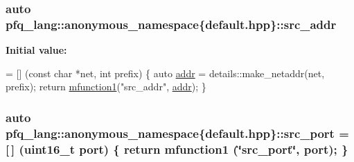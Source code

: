 \hypertarget{namespacepfq__lang_1_1anonymous__namespace_02default_8hpp_03_a63c87ff605d7cefa807fd61bc463785d}{
\subsubsection[{src\+\_\+addr}]{\setlength{\rightskip}{0pt plus 5cm}auto pfq\+\_\+lang\+::anonymous\+\_\+namespace\{default.\+hpp\}\+::src\+\_\+addr}}\label{namespacepfq__lang_1_1anonymous__namespace_02default_8hpp_03_a63c87ff605d7cefa807fd61bc463785d}
{\bfseries Initial value\+:}
\begin{DoxyCode}
= [] (\textcolor{keyword}{const} \textcolor{keywordtype}{char} *net, \textcolor{keywordtype}{int} prefix)
        \{
            \textcolor{keyword}{auto} \hyperlink{namespacepfq__lang_1_1anonymous__namespace_02default_8hpp_03_aafce8334d1be83bff9a2115439c8c453}{addr} = details::make\_netaddr(net, prefix);
            \textcolor{keywordflow}{return} \hyperlink{namespacepfq__lang_a3cc9d61411c0398bb46aa2b33a21f7ed}{mfunction1}(\textcolor{stringliteral}{"src\_addr"}, \hyperlink{namespacepfq__lang_1_1anonymous__namespace_02default_8hpp_03_aafce8334d1be83bff9a2115439c8c453}{addr});
        \}
\end{DoxyCode}
\hypertarget{namespacepfq__lang_1_1anonymous__namespace_02default_8hpp_03_ad4d03d1e69ba9608a2d87ac91a2b521f}{
\subsubsection[{src\+\_\+port}]{\setlength{\rightskip}{0pt plus 5cm}auto pfq\+\_\+lang\+::anonymous\+\_\+namespace\{default.\+hpp\}\+::src\+\_\+port = \mbox{[}$\,$\mbox{]} (uint16\+\_\+t {\bf port}) \{ return {\bf mfunction1} (\char`\"{}src\+\_\+port\char`\"{}, port); \}}}\label{namespacepfq__lang_1_1anonymous__namespace_02default_8hpp_03_ad4d03d1e69ba9608a2d87ac91a2b521f}
